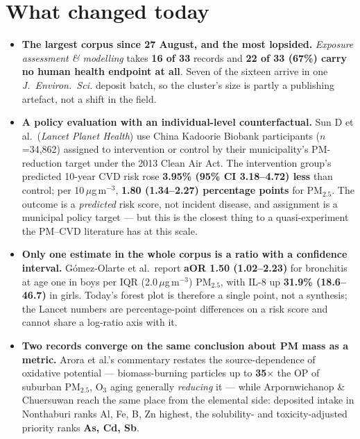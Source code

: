 \documentclass[10pt]{article}
\begin{document}
\vspace{3mm}

\section*{\sffamily\bfseries\color{Deep}What changed today}
\vspace{-1.5mm}{\color{Amber}\rule{\linewidth}{1.1pt}}\vspace{2.5mm}

\footnotesize
\begin{itemize}
\item \textbf{The largest corpus since 27 August, and the most lopsided.}
\textit{Exposure assessment \& modelling} takes \textbf{16 of 33} records and
\textbf{22 of 33 (67\%) carry no human health endpoint at all}. Seven of the sixteen
arrive in one \textit{J.\ Environ.\ Sci.} deposit batch, so the cluster's size is partly a
publishing artefact, not a shift in the field.

\item \textbf{A policy evaluation with an individual-level counterfactual.} Sun D et al.\
(\textit{Lancet Planet Health}) use China Kadoorie Biobank participants ($n$=34{,}862)
assigned to intervention or control by their municipality's PM-reduction target under the
2013 Clean Air Act. The intervention group's predicted 10-year CVD risk rose
\textbf{3.95\% (95\% CI 3.18--4.72) less} than control; per 10\,$\mu$g\,m$^{-3}$,
\textbf{1.80 (1.34--2.27) percentage points} for PM$_{2.5}$. The outcome is a
\emph{predicted} risk score, not incident disease, and assignment is a municipal policy
target --- but this is the closest thing to a quasi-experiment the PM--CVD literature has
at this scale.

\item \textbf{Only one estimate in the whole corpus is a ratio with a confidence
interval.} G\'omez-Olarte et al.\ report \textbf{aOR 1.50 (1.02--2.23)} for bronchitis at
age one in boys per IQR (2.0\,$\mu$g\,m$^{-3}$) PM$_{2.5}$, with IL-8 up
\textbf{31.9\% (18.6--46.7)} in girls. Today's forest plot is therefore a single point,
not a synthesis; the Lancet numbers are percentage-point differences on a risk score and
cannot share a log-ratio axis with it.

\item \textbf{Two records converge on the same conclusion about PM mass as a metric.}
Arora et al.'s commentary restates the source-dependence of oxidative potential ---
biomass-burning particles up to \textbf{35$\times$} the OP of suburban PM$_{2.5}$, O$_3$
aging generally \emph{reducing} it --- while Arpornwichanop \& Chuersuwan reach the same
place from the elemental side: deposited intake in Nonthaburi ranks Al, Fe, B, Zn highest,
the solubility- and toxicity-adjusted priority ranks \textbf{As, Cd, Sb}.


\end{itemize}
\end{document}
